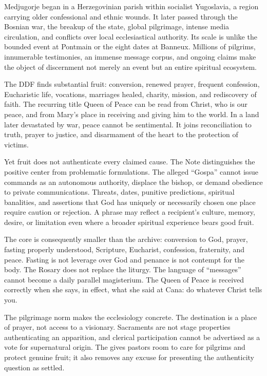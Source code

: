 Medjugorje began in a Herzegovinian parish within socialist Yugoslavia, a region carrying older confessional and ethnic wounds. It later passed through the Bosnian war, the breakup of the state, global pilgrimage, intense media circulation, and conflicts over local ecclesiastical authority. Its scale is unlike the bounded event at Pontmain or the eight dates at Banneux. Millions of pilgrims, innumerable testimonies, an immense message corpus, and ongoing claims make the object of discernment not merely an event but an entire spiritual ecosystem.

The DDF finds substantial fruit: conversion, renewed prayer, frequent confession, Eucharistic life, vocations, marriages healed, charity, mission, and rediscovery of faith. The recurring title Queen of Peace can be read from Christ, who is our peace, and from Mary's place in receiving and giving him to the world. In a land later devastated by war, peace cannot be sentimental. It joins reconciliation to truth, prayer to justice, and disarmament of the heart to the protection of victims.

Yet fruit does not authenticate every claimed cause. The Note distinguishes the positive center from problematic formulations. The alleged ``Gospa'' cannot issue commands as an autonomous authority, displace the bishop, or demand obedience to private communications. Threats, dates, punitive predictions, spiritual banalities, and assertions that God has uniquely or necessarily chosen one place require caution or rejection. A phrase may reflect a recipient's culture, memory, desire, or limitation even where a broader spiritual experience bears good fruit.

The core is consequently smaller than the archive: conversion to God, prayer, fasting properly understood, Scripture, Eucharist, confession, fraternity, and peace. Fasting is not leverage over God and penance is not contempt for the body. The Rosary does not replace the liturgy. The language of ``messages'' cannot become a daily parallel magisterium. The Queen of Peace is received correctly when she says, in effect, what she said at Cana: do whatever Christ tells you.

The pilgrimage norm makes the ecclesiology concrete. The destination is a place of prayer, not access to a visionary. Sacraments are not stage properties authenticating an apparition, and clerical participation cannot be advertised as a vote for supernatural origin. The  gives pastors room to care for pilgrims and protect genuine fruit; it also removes any excuse for presenting the authenticity question as settled.

